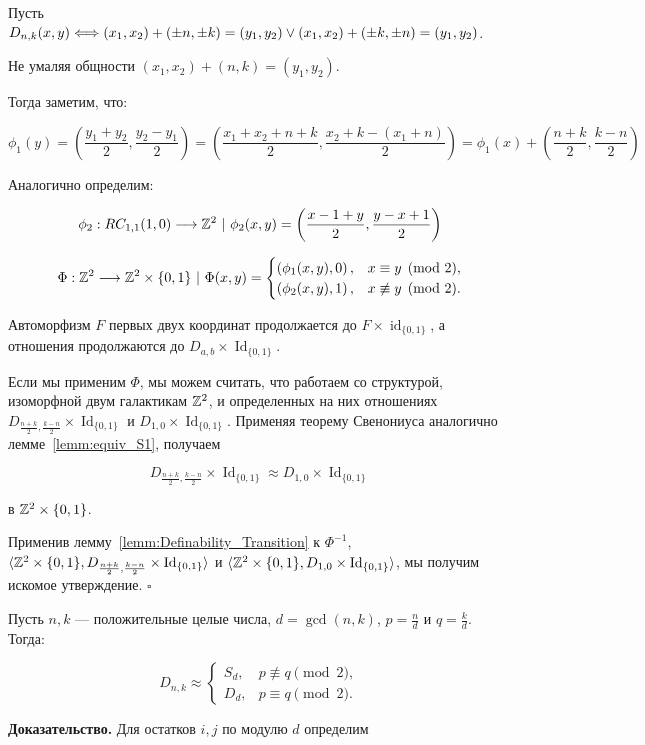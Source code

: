 Пусть $D_{n,k}(x,y) \Longleftrightarrow (x_1, x_2) + (\pm n, \pm k) = (y_1, y_2) \vee (x_1, x_2) + (\pm k, \pm n) = (y_1, y_2)$. 

Не умаляя общности $(x_1, x_2) + (n,k) = (y_1, y_2)$.

Тогда заметим, что:

$$\phi_1(y) = \left(\frac{y_1+y_2}{2},\frac{y_2-y_1}{2}\right) = \left(\frac{x_1+x_2+n+k}{2},\frac{x_2+k-(x_1+n)}{2}\right) = \phi_1(x) + \left(\frac{n+k}{2},\frac{k - n}{2}\right)$$

Аналогично определим:

$$\phi_2: RC_{1,1}(1,0) \then \Int^2\ |\ \phi_2(x,y) = \left(\frac{x-1+y}{2},\frac{y-x+1}{2}\right)$$

$$\Phi : \mathbb{Z}^2 \longrightarrow \mathbb{Z}^2 \times \{0,1\}\ |\ \Phi(x,y) = 
\begin{cases}
    \left(\phi_1(x,y), 0\right), & x \equiv y\pmod 2,\\
    \left(\phi_2(x,y), 1\right), & x \not \equiv y\pmod 2.
\end{cases}$$

Автоморфизм $F$ первых двух координат продолжается до $F\times\operatorname{id}_{\{0,1\}}$, а отношения продолжаются до $D_{a,b}\times\operatorname{Id}_{\{0,1\}}$.

Если мы применим $\Phi$, мы можем считать, что работаем со структурой, изоморфной двум галактикам $\mathbb{Z}^2$, и определенных на них отношениях $D_{\frac{n+k}{2},\frac{k - n}{2}}\times\operatorname{Id}_{\{0,1\}}$ и $D_{1,0}\times\operatorname{Id}_{\{0,1\}}$. Применяя теорему Свенониуса аналогично лемме~\ref{lemm:equiv_S1}, получаем

$$D_{\frac{n+k}{2},\frac{k - n}{2}}\times\operatorname{Id}_{\{0,1\}} \approx D_{1,0}\times\operatorname{Id}_{\{0,1\}}$$

в $\mathbb{Z}^2\times\{0,1\}$.

Применив лемму~\ref{lemm:Definability_Transition} к $\Phi^{-1}$, $\langle\mathbb{Z}^2\times\{0,1\},D_{\frac{n+k}{2},\frac{k - n}{2}}\times\operatorname{Id}_{\{0,1\}}\rangle$ и $\langle\mathbb{Z}^2\times\{0,1\},D_{1,0}\times\operatorname{Id}_{\{0,1\}}\rangle$, мы получим искомое утверждение. \hfill $\square$


\begin{theorem}
    \label{theorem:DnkToSorD}
    Пусть $n,k$ --- положительные целые числа, $d=\gcd(n,k)$, $p=\frac{n}{d}$ и $q=\frac{k}{d}$. Тогда:
    
    $$
        D_{n,k} \approx
        \begin{cases}
            S_d, & p\not\equiv q\pmod 2,\\
            D_d, & p\equiv q\pmod 2.
        \end{cases}
    $$
\end{theorem}
\textbf{Доказательство.}
Для остатков $i,j$ по модулю $d$ определим

